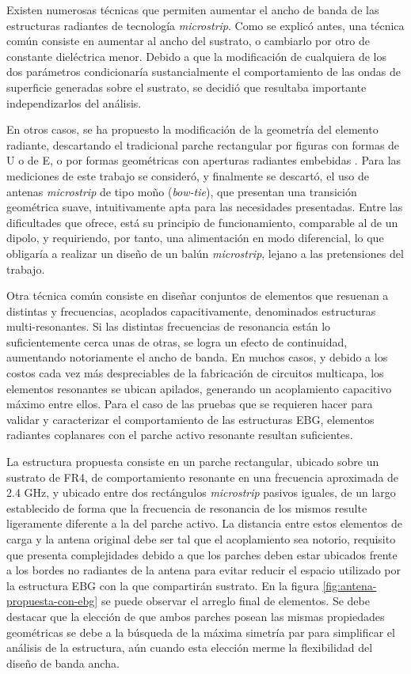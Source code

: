 Existen numerosas técnicas que permiten aumentar el ancho de banda de las estructuras radiantes de tecnología \textit{microstrip}. Como se explicó antes, una técnica común consiste en aumentar al ancho del sustrato, o cambiarlo por otro de constante dieléctrica menor. Debido a que la modificación de cualquiera de los dos parámetros condicionaría sustancialmente el comportamiento de las ondas de superficie generadas sobre el sustrato, se decidió que resultaba importante independizarlos del análisis.

En otros casos, se ha propuesto la modificación de la geometría del elemento radiante, descartando el tradicional parche rectangular por figuras con formas de U o de E, o por formas geométricas con aperturas radiantes embebidas \cite{Yang:EBGAntennas}. Para las mediciones de este trabajo se consideró, y finalmente se descartó, el uso de antenas \textit{microstrip} de tipo moño (\textit{bow-tie}), que presentan una transición geométrica suave, intuitivamente apta para las necesidades presentadas. Entre las dificultades que ofrece, está su principio de funcionamiento, comparable al de un dipolo, y requiriendo, por tanto, una alimentación en modo diferencial, lo que obligaría a realizar un diseño de un balún \textit{microstrip}, lejano a las pretensiones del trabajo.

Otra técnica común consiste en diseñar conjuntos de elementos que resuenan a distintas y frecuencias, acoplados capacitivamente, denominados estructuras multi-resonantes. Si las distintas frecuencias de resonancia están lo suficientemente cerca unas de otras, se logra un efecto de continuidad, aumentando notoriamente el ancho de banda. En muchos casos, y debido a los costos cada vez más despreciables de la fabricación de circuitos multicapa, los elementos resonantes se ubican apilados, generando un acoplamiento capacitivo máximo entre ellos. Para el caso de las pruebas que se requieren hacer para validar y caracterizar el comportamiento de las estructuras EBG, elementos radiantes coplanares con el parche activo resonante resultan suficientes.

La estructura propuesta consiste en un parche rectangular, ubicado sobre un sustrato de FR4, de comportamiento resonante en una frecuencia aproximada de 2.4 GHz, y ubicado entre dos rectángulos \textit{microstrip} pasivos iguales, de un largo establecido de forma que la frecuencia de resonancia de los mismos resulte ligeramente diferente a la del parche activo. La distancia entre estos elementos de carga y la antena original debe ser tal que el acoplamiento sea notorio, requisito que presenta complejidades \cite{Kumar:radiating} debido a que los parches deben estar ubicados frente a los bordes no radiantes de la antena para evitar reducir el espacio utilizado por la estructura EBG con la que compartirán sustrato. En la figura \ref{fig:antena-propuesta-con-ebg} se puede observar el arreglo final de elementos. Se debe destacar que la elección de que ambos parches posean las mismas propiedades geométricas se debe a la búsqueda de la máxima simetría par para simplificar el análisis de la estructura, aún cuando esta elección merme la flexibilidad del diseño de banda ancha.

